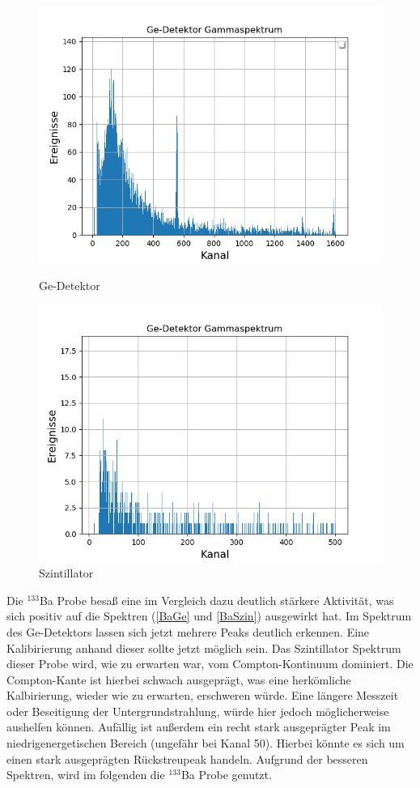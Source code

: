 \begin{figure}[h]
  \includegraphics[width=\linewidth]{images/Na22ge.png}
  \caption{Ge-Detektor}
  \label{NaGe}
\endminipage\hfill
{}
  \includegraphics[width=\linewidth]{images/Na22szin.png}
  \caption{Szintillator}
  \label{NaSzin}
\endminipage\hfill
\end{figure}

Die $^{133}$Ba Probe besaß eine im Vergleich dazu deutlich stärkere Aktivität, was sich positiv auf die Spektren (\ref{BaGe} und \ref{BaSzin}) ausgewirkt hat.
Im Spektrum des Ge-Detektors lassen sich jetzt mehrere Peaks deutlich erkennen.
Eine Kalibirierung anhand dieser sollte jetzt möglich sein.
Das Szintillator Spektrum dieser Probe wird, wie  zu erwarten war, vom Compton-Kontinuum dominiert.
Die Compton-Kante ist hierbei schwach ausgeprägt, was eine herkömliche Kalbirierung, wieder wie zu erwarten, erschweren würde.
Eine längere Messzeit oder Beseitigung der Untergrundstrahlung, würde hier jedoch möglicherweise aushelfen können.
Aufällig ist außerdem ein recht stark ausgeprägter Peak im niedrigenergetischen Bereich (ungefähr bei Kanal 50).
Hierbei könnte es sich um einen stark ausgeprägten Rückstreupeak handeln.
Aufgrund der besseren Spektren, wird im folgenden die $^{133}$Ba Probe genutzt.

